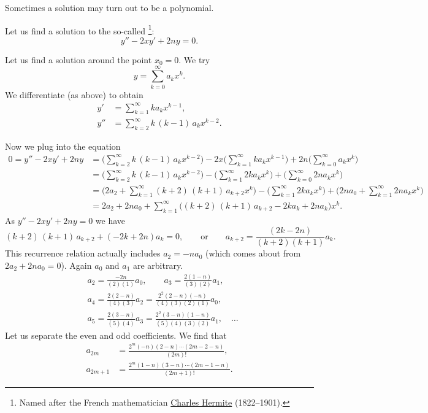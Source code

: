\medskip

Sometimes a solution may turn out to be a polynomial.

\begin{example}
Let us find a solution to the so-called
\emph{}%
\footnote{Named after the French mathematician
\href{http://en.wikipedia.org/wiki/Hermite}{Charles Hermite}
(1822--1901).}:
\begin{equation*}
y'' -2xy' + 2n y = 0 .
\end{equation*}

Let us find a solution around the point $x_0 = 0$.
We try
\begin{equation*}
y = \sum_{k=0}^\infty a_k x^k .
\end{equation*}
We differentiate (as above) to obtain
\begin{align*}
y' &= \sum_{k=1}^\infty k a_k x^{k-1} ,
\\
y'' &= \sum_{k=2}^\infty k\,(k-1) \, a_k x^{k-2} .
\end{align*}

Now we plug into the equation
\begin{equation*}
\begin{split}
0 = y''-2xy'+2ny &= 
\Biggl( \sum_{k=2}^\infty k\,(k-1) \, a_k x^{k-2}  \Biggr)
-
2x
\Biggl( \sum_{k=1}^\infty k a_k x^{k-1} \Biggr)
+
2n
\Biggl( \sum_{k=0}^\infty a_k x^k \Biggr)
\\
&=
\Biggl( \sum_{k=2}^\infty k\,(k-1) \, a_k x^{k-2}  \Biggr)
-
\Biggl( \sum_{k=1}^\infty 2k a_k x^k \Biggr)
+
\Biggl( \sum_{k=0}^\infty 2n a_k x^k \Biggr)
\\
&=
\Biggl(2a_2+
 \sum_{k=1}^\infty (k+2)\,(k+1) \, a_{k+2} x^k  \Biggr)
-
\Biggl( \sum_{k=1}^\infty 2k a_k x^k \Biggr)
+
\Biggl(
2na_0 + 
\sum_{k=1}^\infty 2n a_k x^k \Biggr)
\\
&=
2a_2+2na_0+
\sum_{k=1}^\infty \bigl( (k+2)\,(k+1) \, a_{k+2} - 2ka_k + 2n a_k \bigr) x^k .
\end{split}
\end{equation*}
As $y''-2xy'+2ny = 0$ we have
\begin{equation*}
(k+2)\,(k+1) \, a_{k+2} + ( - 2k+ 2n) a_k = 0 ,
\qquad
\text{or}
\qquad
a_{k+2} = \frac{(2k-2n)}{(k+2)(k+1)} a_k .
\end{equation*}
This recurrence relation actually includes
$a_2 = -na_0$ (which comes about from $2a_2+2na_0 = 0$).
Again $a_0$ and $a_1$ are arbitrary.
\begin{align*}
& a_2 = \frac{-2n}{(2)(1)}a_0, \qquad
a_3 = \frac{2(1-n)}{(3)(2)} a_1,
\\
& a_4 = \frac{2(2-n)}{(4)(3)} a_2 = \frac{2^2(2-n)(-n)}{(4)(3)(2)(1)} a_0 ,
\\
&
a_5 = \frac{2(3-n)}{(5)(4)} a_3 = \frac{2^2(3-n)(1-n)}{(5)(4)(3)(2)} a_1 ,
\quad \ldots
\end{align*}
Let us separate the even and odd coefficients.
We find that 
\begin{align*}
a_{2m} &=\frac{2^m(-n)(2-n)\cdots(2m-2-n)}{(2m)!} , \\
a_{2m+1} &=\frac{2^m(1-n)(3-n)\cdots(2m-1-n)}{(2m+1)!} .
\end{align*}


\end{example}
